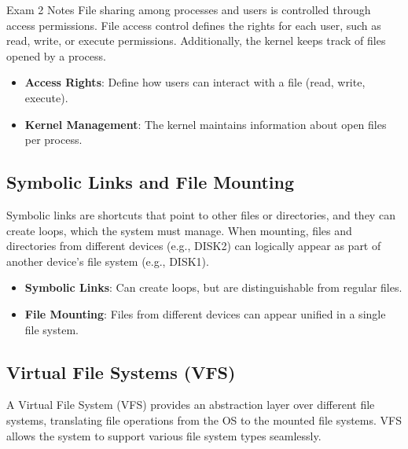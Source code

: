 \begin{examnotes}{Exam 2 Notes}
    File sharing among processes and users is controlled through access permissions. File access control defines the rights for each user, such as read, write, or execute permissions. Additionally, 
    the kernel keeps track of files opened by a process.
    
    \begin{highlight}
        \begin{itemize}
            \item \textbf{Access Rights}: Define how users can interact with a file (read, write, execute).
            \item \textbf{Kernel Management}: The kernel maintains information about open files per process.
        \end{itemize}
    \end{highlight}
    
    \subsection*{Symbolic Links and File Mounting}
    
    Symbolic links are shortcuts that point to other files or directories, and they can create loops, which the system must manage. When mounting, files and directories from different devices (e.g., DISK2) 
    can logically appear as part of another device's file system (e.g., DISK1).
    
    \begin{highlight}
        \begin{itemize}
            \item \textbf{Symbolic Links}: Can create loops, but are distinguishable from regular files.
            \item \textbf{File Mounting}: Files from different devices can appear unified in a single file system.
        \end{itemize}
    \end{highlight}

    \subsection*{Virtual File Systems (VFS)}

    A Virtual File System (VFS) provides an abstraction layer over different file systems, translating file operations from the OS to the mounted file systems. VFS allows the system to support various file 
    system types seamlessly.
    

\end{examnotes}
